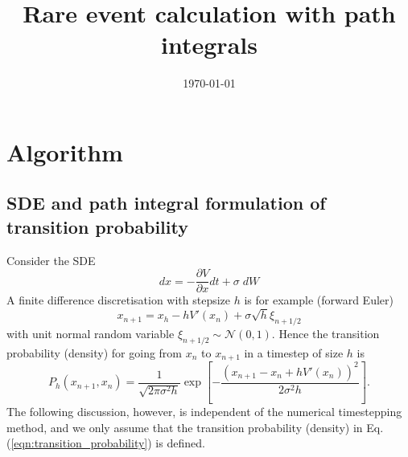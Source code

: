 \documentclass{article}
\title{Rare event calculation with path integrals}
\date{\today}
\begin{document}
\maketitle
\section{Algorithm}
\subsection{SDE and path integral formulation of transition probability}
Consider the SDE
\begin{equation}
dx = -\frac{\partial V}{\partial x}dt+\sigma\;dW
\end{equation}
A finite difference discretisation with stepsize $h$ is for example (forward Euler)
\begin{equation}
x_{n+1} = x_h - hV'(x_n) + \sigma \sqrt{h}\xi_{n+1/2}
\end{equation}
with unit normal random variable $\xi_{n+1/2}\sim\mathcal{N}(0,1)$. Hence the transition probability (density) for going from $x_n$ to $x_{n+1}$ in a timestep of size $h$ is
\begin{equation}
P_h(x_{n+1},x_n) = \frac{1}{\sqrt{2\pi\sigma^2 h}}
\exp\left[
-\frac{\left(x_{n+1}-x_n+hV'(x_n)\right)^2}{2\sigma^2 h}
\right]\label{eqn:transition_probability}.
\end{equation}
The following discussion, however, is independent of the numerical timestepping method, and we only assume that the transition probability (density) in Eq. (\ref{eqn:transition_probability}) is defined.
\end{document}
